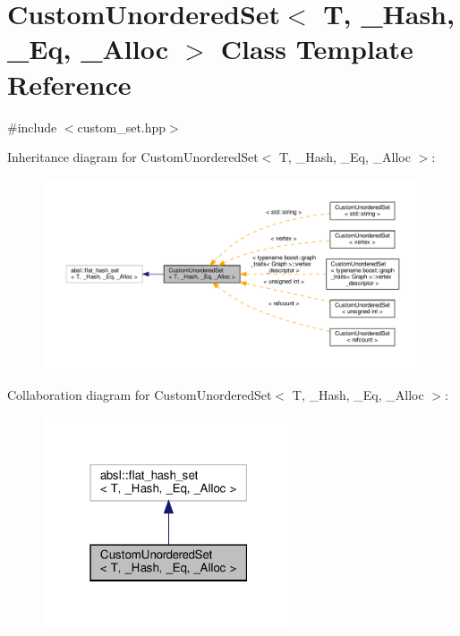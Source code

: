 \hypertarget{classCustomUnorderedSet}{}\section{Custom\+Unordered\+Set$<$ T, \+\_\+\+Hash, \+\_\+\+Eq, \+\_\+\+Alloc $>$ Class Template Reference}
\label{classCustomUnorderedSet}


{\ttfamily \#include $<$custom\+\_\+set.\+hpp$>$}



Inheritance diagram for Custom\+Unordered\+Set$<$ T, \+\_\+\+Hash, \+\_\+\+Eq, \+\_\+\+Alloc $>$\+:
\nopagebreak
\begin{figure}[H]
\begin{center}
\leavevmode
\includegraphics[width=350pt]{dc/d92/classCustomUnorderedSet__inherit__graph}
\end{center}
\end{figure}


Collaboration diagram for Custom\+Unordered\+Set$<$ T, \+\_\+\+Hash, \+\_\+\+Eq, \+\_\+\+Alloc $>$\+:
\nopagebreak
\begin{figure}[H]
\begin{center}
\leavevmode
\includegraphics[width=211pt]{d7/d10/classCustomUnorderedSet__coll__graph}
\end{center}
\end{figure}
